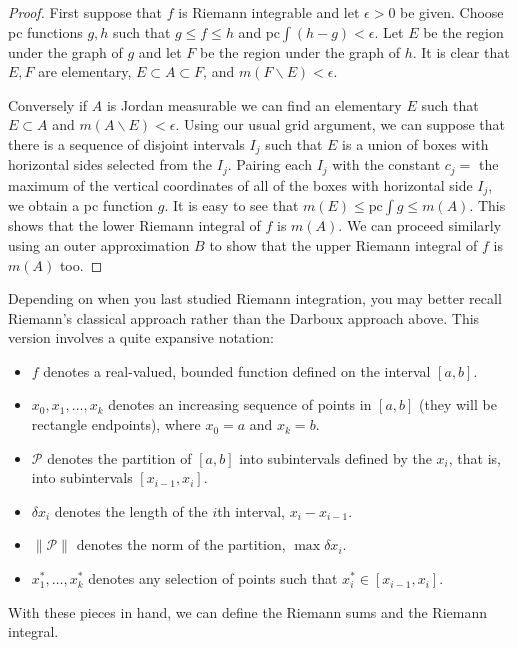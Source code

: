 \documentclass[11pt,oneside]{amsbook}
\renewcommand{\setminus}{\smallsetminus}
\theoremstyle{definition}
\theoremstyle{plain}
\theoremstyle{definition}
\theoremstyle{remark}
\numberwithin{equation}{section}
\numberwithin{figure}{section}
\begin{document}
\begin{proof}
  First suppose that $f$ is Riemann integrable and let $\epsilon>0$ be given. Choose pc functions $g,h$ such that $g\leq f\leq h$ and $\text{pc}\int(h-g)<\epsilon$. Let $E$ be the region under the graph of $g$ and let $F$ be the region under the graph of $h$. It is clear that $E,F$ are elementary, $E\subset A\subset F$, and $m(F\setminus E)<\epsilon$.

  Conversely if $A$ is Jordan measurable we can find an elementary $E$ such that $E\subset A$ and $m(A\setminus E)<\epsilon$. Using our usual grid argument, we can suppose that there is a sequence of disjoint intervals $I_j$ such that $E$ is a union of boxes with horizontal sides selected from the $I_j$. Pairing each $I_j$ with the constant $c_j=$ the maximum of the vertical coordinates of all of the boxes with horizontal side $I_j$, we obtain a pc function $g$. It is easy to see that $m(E)\leq \text{pc}\int g\leq m(A)$. This shows that the lower Riemann integral of $f$ is $m(A)$. We can proceed similarly using an outer approximation $B$ to show that the upper Riemann integral of $f$ is $m(A)$ too.
\end{proof}

Depending on when you last studied Riemann integration, you may better recall Riemann's classical approach rather than the Darboux approach above. This version involves a quite expansive notation:

\begin{itemize}
\item $f$ denotes a real-valued, bounded function defined on the interval $[a,b]$.
\item $x_0,x_1,\ldots,x_k$ denotes an increasing sequence of points in $[a,b]$ (they will be rectangle endpoints), where $x_0=a$ and $x_k=b$.
\item $\mathcal P$ denotes the partition of $[a,b]$ into subintervals defined by the $x_i$, that is, into subintervals $[x_{i-1},x_i]$.
\item $\delta x_i$ denotes the length of the $i$th interval, $x_i-x_{i-1}$.
\item $\|\mathcal P\|$ denotes the norm of the partition, $\max\delta x_i$.
\item $x_1^*,\ldots,x_k^*$ denotes any selection of points such that $x_i^*\in[x_{i-1},x_i]$.
\end{itemize}

With these pieces in hand, we can define the Riemann sums and the Riemann integral.
\end{document}
